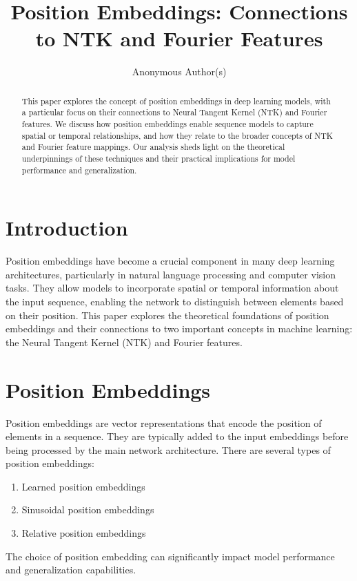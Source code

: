 \documentclass{article}
\title{Position Embeddings: Connections to NTK and Fourier Features}
\author{Anonymous Author(s)}
\begin{document}
\maketitle

\begin{abstract}
This paper explores the concept of position embeddings in deep learning models, with a particular focus on their connections to Neural Tangent Kernel (NTK) and Fourier features. We discuss how position embeddings enable sequence models to capture spatial or temporal relationships, and how they relate to the broader concepts of NTK and Fourier feature mappings. Our analysis sheds light on the theoretical underpinnings of these techniques and their practical implications for model performance and generalization.
\end{abstract}

\section{Introduction}

Position embeddings have become a crucial component in many deep learning architectures, particularly in natural language processing and computer vision tasks. They allow models to incorporate spatial or temporal information about the input sequence, enabling the network to distinguish between elements based on their position. This paper explores the theoretical foundations of position embeddings and their connections to two important concepts in machine learning: the Neural Tangent Kernel (NTK) and Fourier features.

\section{Position Embeddings}

Position embeddings are vector representations that encode the position of elements in a sequence. They are typically added to the input embeddings before being processed by the main network architecture. There are several types of position embeddings:

\begin{enumerate}
    \item Learned position embeddings
    \item Sinusoidal position embeddings
    \item Relative position embeddings
\end{enumerate}

The choice of position embedding can significantly impact model performance and generalization capabilities.
\end{document}
